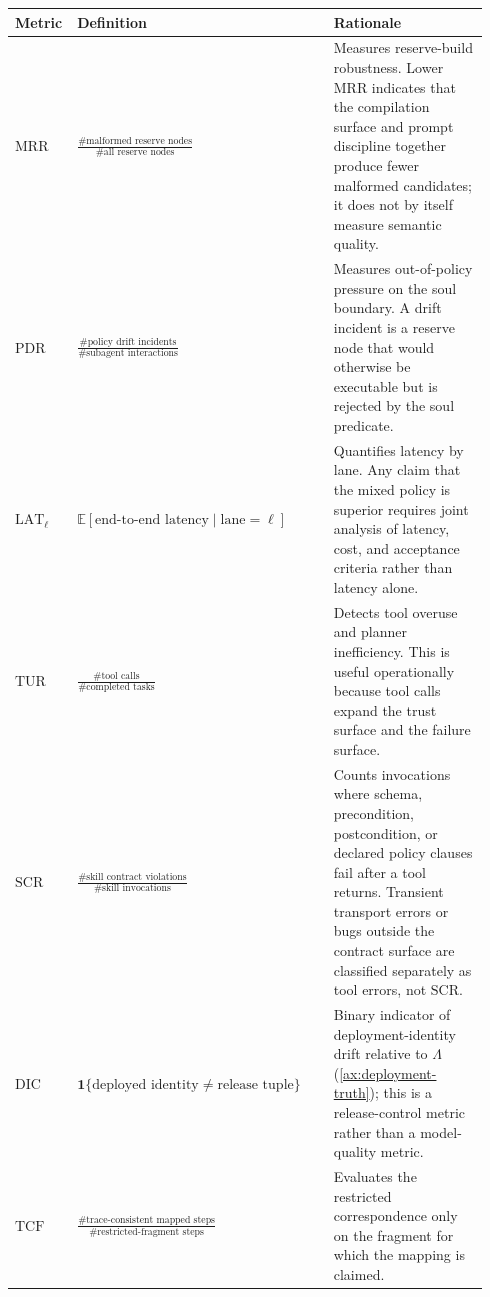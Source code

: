 \documentclass[11pt]{article}
\theoremstyle{remark}
\begin{document}
\begin{center}
\small
\begin{tabular}{@{}p{0.09\linewidth}p{0.53\linewidth}p{0.32\linewidth}@{}}
\toprule
\textbf{Metric} & \textbf{Definition} & \textbf{Rationale} \\
\midrule
\(\mathrm{MRR}\) & \(\displaystyle \frac{\#\text{malformed reserve nodes}}{\#\text{all reserve nodes}}\) & Measures reserve-build robustness. Lower MRR indicates that the compilation surface and prompt discipline together produce fewer malformed candidates; it does not by itself measure semantic quality. \\[0.8em]
\(\mathrm{PDR}\) & \(\displaystyle \frac{\#\text{policy drift incidents}}{\#\text{subagent interactions}}\) & Measures out-of-policy pressure on the soul boundary. A drift incident is a reserve node that would otherwise be executable but is rejected by the soul predicate. \\[0.8em]
\(\mathrm{LAT}_{\ell}\) & \(\displaystyle \mathbb{E}[\text{end-to-end latency}\mid \text{lane}=\ell]\) & Quantifies latency by lane. Any claim that the mixed policy is superior requires joint analysis of latency, cost, and acceptance criteria rather than latency alone. \\[0.8em]
\(\mathrm{TUR}\) & \(\displaystyle \frac{\#\text{tool calls}}{\#\text{completed tasks}}\) & Detects tool overuse and planner inefficiency. This is useful operationally because tool calls expand the trust surface and the failure surface. \\[0.8em]
\(\mathrm{SCR}\) & \(\displaystyle \frac{\#\text{skill contract violations}}{\#\text{skill invocations}}\) & Counts invocations where schema, precondition, postcondition, or declared policy clauses fail after a tool returns. Transient transport errors or bugs outside the contract surface are classified separately as tool errors, not \(\mathrm{SCR}\). \\[0.8em]
\(\mathrm{DIC}\) & \(\displaystyle \mathbf{1}\{\text{deployed identity} \neq \text{release tuple}\}\) & Binary indicator of deployment-identity drift relative to \(\Lambda\) (\cref{ax:deployment-truth}); this is a release-control metric rather than a model-quality metric. \\[0.8em]
\(\mathrm{TCF}\) & \(\displaystyle \frac{\#\text{trace-consistent mapped steps}}{\#\text{restricted-fragment steps}}\) & Evaluates the restricted correspondence only on the fragment for which the mapping is claimed. \\
\bottomrule
\end{tabular}
\end{center}
\end{document}
